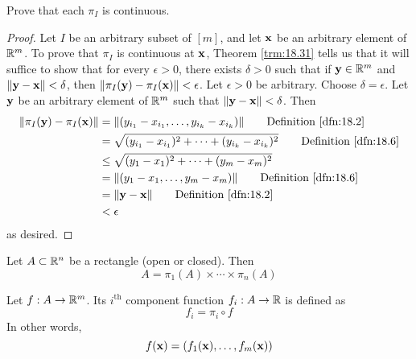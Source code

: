 \documentclass[../main.tex]{subfiles}
\begin{document}
\begin{exercise}\label{exr:18.35}
    Prove that each $\pi_I$ is continuous.
    \begin{proof}
        Let $I$ be an arbitrary subset of $[m]$, and let $\mathbf{x}$ be an arbitrary element of $\mathbb{R}^m$. To prove that $\pi_I$ is continuous at $\mathbf{x}$, Theorem \ref{trm:18.31} tells us that it will suffice to show that for every $\epsilon>0$, there exists $\delta>0$ such that if $\mathbf{y}\in\mathbb{R}^m$ and $\norm{\mathbf{y}-\mathbf{x}}<\delta$, then $\norm{\pi_I(\mathbf{y})-\pi_I(\mathbf{x})}<\epsilon$. Let $\epsilon>0$ be arbitrary. Choose $\delta=\epsilon$. Let $\mathbf{y}$ be an arbitrary element of $\mathbb{R}^m$ such that $\norm{\mathbf{y}-\mathbf{x}}<\delta$. Then
        \begin{align*}
            \norm{\pi_I(\y)-\pi_I(\x)} &= \norm{(y_{i_1}-x_{i_1},\dots,y_{i_k}-x_{i_k})}\tag*{Definition \ref{dfn:18.2}}\\
            &= \sqrt{(y_{i_1}-x_{i_1})^2+\cdots+(y_{i_k}-x_{i_k})^2}\tag*{Definition \ref{dfn:18.6}}\\
            &\leq \sqrt{(y_1-x_1)^2+\cdots+(y_m-x_m)^2}\\
            &= \norm{(y_1-x_1,\dots,y_m-x_m)}\tag*{Definition \ref{dfn:18.6}}\\
            &= \norm{\y-\x}\tag*{Definition \ref{dfn:18.2}}\\
            &< \epsilon
        \end{align*}
        as desired.
    \end{proof}
\end{exercise}

\begin{remark}\label{rmk:18.36}
    Let $A\subset\mathbb{R}^n$ be a rectangle (open or closed). Then
    \begin{equation*}
        A = \pi_1(A)\times\cdots\times\pi_n(A)
    \end{equation*}
\end{remark}

\begin{definition}\label{dfn:18.37}
    Let $f:A\to\mathbb{R}^m$. Its $i^\text{th}$ component function $f_i:A\to\mathbb{R}$ is defined as
    \begin{equation*}
        f_i = \pi_i\circ f
    \end{equation*}
    In other words,
    \begin{equation*}
        f(\mathbf{x}) = (f_1(\mathbf{x}),\dots,f_m(\mathbf{x}))
    \end{equation*}
\end{definition}
\end{document}
